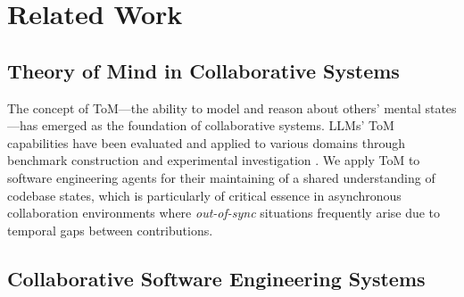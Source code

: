 \section{Related Work}

\subsection{Theory of Mind in Collaborative Systems}

The concept of ToM---the ability to model and reason about others' mental states---has emerged as the foundation of collaborative systems. 
LLMs' ToM capabilities have been evaluated and applied to various domains through benchmark construction \cite{benchmark_tombench, benchmark_opentom, benchmark_Hi_ToM, benchmark_fantom} and experimental investigation \cite{LLM_ToM_human_like_reasoning, ToM_multimodal_video_LLM, ToM_nature, spontaneous_ToM, improve_LLM_ToM, ToM_in_HRI}.
We apply ToM to software engineering agents for their maintaining of a shared understanding of codebase states, which is particularly of critical essence in asynchronous collaboration environments where \textit{out-of-sync} situations frequently arise due to temporal gaps between contributions.





\subsection{Collaborative Software Engineering Systems}


